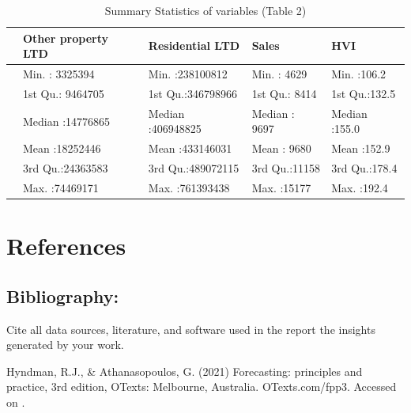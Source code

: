 \documentclass[11pt,a4paper,]{article}
\begin{document}
\begin{table}

\caption{\label{tab:statsumtwo}Summary Statistics of variables (Table 2)}
\centering
\begin{tabular}[t]{lllll}
\toprule
  & Other property LTD & Residential LTD & Sales & HVI\\
\midrule
 & Min.   : 3325394 & Min.   :238100812 & Min.   : 4629 & Min.   :106.2\\
 & 1st Qu.: 9464705 & 1st Qu.:346798966 & 1st Qu.: 8414 & 1st Qu.:132.5\\
 & Median :14776865 & Median :406948825 & Median : 9697 & Median :155.0\\
 & Mean   :18252446 & Mean   :433146031 & Mean   : 9680 & Mean   :152.9\\
 & 3rd Qu.:24363583 & 3rd Qu.:489072115 & 3rd Qu.:11158 & 3rd Qu.:178.4\\
\addlinespace
 & Max.   :74469171 & Max.   :761393438 & Max.   :15177 & Max.   :192.4\\
\bottomrule
\end{tabular}
\end{table}

\section{References}\label{references}

\subsection{Bibliography:}\label{bibliography}

Cite all data sources, literature, and software used in the report the insights generated by your work.

Hyndman, R.J., \& Athanasopoulos, G. (2021) Forecasting: principles and practice, 3rd edition, OTexts: Melbourne, Australia. OTexts.com/fpp3. Accessed on .

\printbibliography
\end{document}
